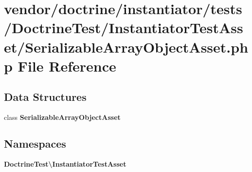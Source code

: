 \section{vendor/doctrine/instantiator/tests/\+Doctrine\+Test/\+Instantiator\+Test\+Asset/\+Serializable\+Array\+Object\+Asset.php File Reference}
\label{_serializable_array_object_asset_8php}
\subsection*{Data Structures}
\begin{DoxyCompactItemize}
\item 
class {\bf Serializable\+Array\+Object\+Asset}
\end{DoxyCompactItemize}
\subsection*{Namespaces}
\begin{DoxyCompactItemize}
\item 
 {\bf Doctrine\+Test\textbackslash{}\+Instantiator\+Test\+Asset}
\end{DoxyCompactItemize}
